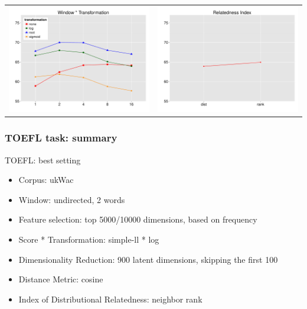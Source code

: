 \documentclass[t]{beamer} %
\begin{document}
\begin{frame}
{\begin{tabular}{c@{}c}
      \includegraphics[scale=0.30]{img/lapesa_toefl_main_window_transformation} &
      \includegraphics[scale=0.30]{img/lapesa_toefl_main_relindex}
    \end{tabular}
  }
\end{frame}

\begin{frame}
  \frametitle{TOEFL task: summary}
  \begin{exampleblock}{TOEFL: best setting}
    \begin{itemize}\footnotesize
    \item Corpus: ukWac
    \item Window: undirected, 2 words 
    \item Feature selection: top 5000/10000 dimensions, based on frequency
    \item Score * Transformation: simple-ll * log
    \item Dimensionality Reduction: 900 latent dimensions, skipping the first 100
    \item Distance Metric: cosine
    \item Index of Distributional Relatedness: neighbor rank
    \end{itemize}
  \end{exampleblock}   
  
\end{frame}
\end{document}
